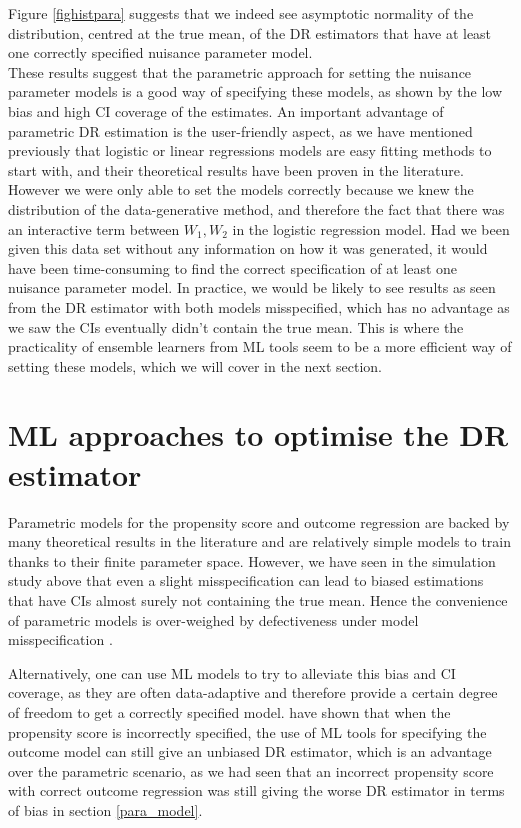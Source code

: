 \documentclass[12pt,twoside]{article}
\begin{document}
Figure \ref{fighistpara} suggests that we indeed see asymptotic normality of the distribution, centred at the true mean, of the DR estimators that have at least one correctly specified nuisance parameter model.\\

These results suggest that the parametric approach for setting the nuisance parameter models is a good way of specifying these models, as shown by the low bias and high CI coverage of the estimates. An important advantage of parametric DR estimation is the user-friendly aspect, as we have mentioned previously that logistic or linear regressions models are easy fitting methods to start with, and their theoretical results have been proven in the literature. However we were only able to set the models correctly because we knew the distribution of the data-generative method, and therefore the fact that there was an interactive term between $W_1, W_2$ in the logistic regression model. Had we been given this data set without any information on how it was generated, it would have been time-consuming to find the correct specification of at least one nuisance parameter model. In practice, we would be likely to see results as seen from the DR estimator with both models misspecified, which has no advantage as we saw the CIs eventually didn't contain the true mean. This is where the practicality of ensemble learners from ML tools seem to be a more efficient way of setting these models, which we will cover in the next section.

\clearpage
\section{ML approaches to optimise the DR estimator}

Parametric models for the propensity score and outcome regression are backed by many theoretical results in the literature and are relatively simple models to train thanks to their finite parameter space. However, we have seen in the simulation study above that even a slight misspecification can lead to biased estimations that have CIs almost surely not containing the true mean. Hence the convenience of parametric models is over-weighed by defectiveness under model misspecification \citep{diaz}.

Alternatively, one can use ML models to try to alleviate this bias and CI coverage, as they are often data-adaptive and therefore provide a certain degree of freedom to get a correctly specified model. \citet{ps_SL} have shown that when the propensity score is incorrectly specified, the use of ML tools for specifying the outcome model can still give an unbiased DR estimator, which is an advantage over the parametric scenario, as we had seen that an incorrect propensity score with correct outcome regression was still giving the worse DR estimator in terms of bias in section \ref{para_model}.
\end{document}
